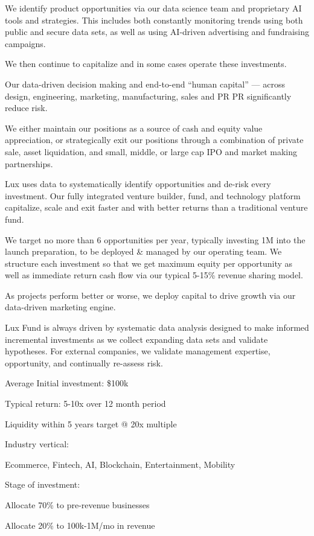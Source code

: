 \documentclass[11pt]{article}
\begin{document}
We identify product opportunities via our data science team and proprietary AI tools and strategies. This includes both constantly monitoring trends using both public and secure data sets, as well as using AI-driven advertising and fundraising campaigns.


We then continue to capitalize and in some cases operate these investments.


Our data-driven decision making and end-to-end ``human capital'' --- across design, engineering, marketing, manufacturing, sales and PR PR significantly reduce risk.


We either maintain our positions as a source of cash and equity value appreciation, or strategically exit our positions through a combination of private sale, asset liquidation, and small, middle, or large cap IPO and market making partnerships.


Lux uses data to systematically identify opportunities and de-risk every investment. Our fully integrated venture builder, fund, and technology platform capitalize, scale and exit faster and with better returns than a traditional venture fund.


We target no more than 6 opportunities per year, typically investing 1M into the launch preparation, to be deployed \& managed by our operating team. We structure each investment so that we get maximum equity per opportunity as well as immediate return cash flow via our typical 5-15\% revenue sharing model.


As projects perform better or worse, we deploy capital to drive growth via our data-driven marketing engine.


Lux Fund is always driven by systematic data analysis designed to make informed incremental investments as we collect expanding data sets and validate hypotheses. For external companies, we validate management expertise, opportunity, and continually re-assess risk.


Average Initial investment: \$100k


Typical return: 5-10x over 12 month period


Liquidity within 5 years target @ 20x multiple


Industry vertical:


Ecommerce, Fintech, AI, Blockchain, Entertainment, Mobility


Stage of investment:


Allocate 70\% to pre-revenue businesses


Allocate 20\% to 100k-1M/mo in revenue
\end{document}
